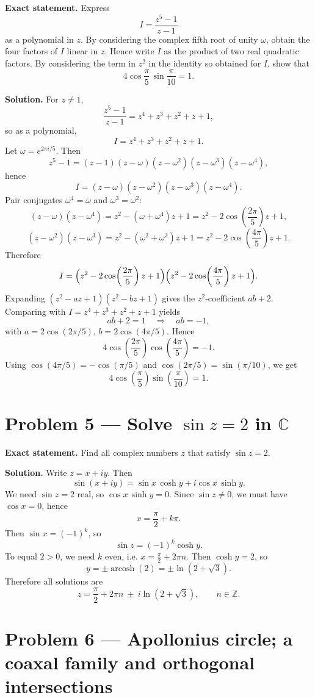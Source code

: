 \documentclass[12pt,a4paper]{article}
\theoremstyle{plain}
\theoremstyle{definition}      %
\begin{document}
\textbf{Exact statement.}
Express
\[
I=\frac{z^5-1}{z-1}
\]
as a polynomial in \(z\). By considering the complex fifth root of unity \(\omega\), obtain the four factors of \(I\) linear in \(z\).
Hence write \(I\) as the product of two real quadratic factors. By considering the term in \(z^2\) in the identity so obtained for \(I\),
show that
\[
4\cos\frac{\pi}{5}\,\sin\frac{\pi}{10}=1.
\]

\textbf{Solution.}
For \(z\neq1\),
\[
\frac{z^5-1}{z-1}=z^4+z^3+z^2+z+1,
\]
so as a polynomial,
\[
I=z^4+z^3+z^2+z+1.
\]
Let \(\omega=e^{2\pi i/5}\). Then
\[
z^5-1=(z-1)(z-\omega)(z-\omega^2)(z-\omega^3)(z-\omega^4),
\]
hence
\[
I=(z-\omega)(z-\omega^2)(z-\omega^3)(z-\omega^4).
\]
Pair conjugates \(\omega^4=\overline{\omega}\) and \(\omega^3=\overline{\omega^2}\):
\[
(z-\omega)(z-\omega^4)=z^2-(\omega+\omega^4)z+1
= z^2-2\cos\!\left(\frac{2\pi}{5}\right)z+1,
\]
\[
(z-\omega^2)(z-\omega^3)=z^2-(\omega^2+\omega^3)z+1
= z^2-2\cos\!\left(\frac{4\pi}{5}\right)z+1.
\]
Therefore
\[
I=\Bigl(z^2-2\cos\!\left(\frac{2\pi}{5}\right)z+1\Bigr)
\Bigl(z^2-2\cos\!\left(\frac{4\pi}{5}\right)z+1\Bigr).
\]
Expanding \((z^2-az+1)(z^2-bz+1)\) gives the \(z^2\)-coefficient \(ab+2\). Comparing with
\(I=z^4+z^3+z^2+z+1\) yields
\[
ab+2=1\quad\Longrightarrow\quad ab=-1,
\]
with \(a=2\cos(2\pi/5)\), \(b=2\cos(4\pi/5)\). Hence
\[
4\cos\!\left(\frac{2\pi}{5}\right)\cos\!\left(\frac{4\pi}{5}\right)=-1.
\]
Using \(\cos(4\pi/5)=-\cos(\pi/5)\) and \(\cos(2\pi/5)=\sin(\pi/10)\), we get
\[
4\cos\!\left(\frac{\pi}{5}\right)\sin\!\left(\frac{\pi}{10}\right)=1.
\]


\section*{Problem 5 — Solve \(\sin z=2\) in \(\mathbb{C}\)}

\textbf{Exact statement.}
Find all complex numbers \(z\) that satisfy \(\sin z=2\).

\textbf{Solution.}
Write \(z=x+iy\). Then
\[
\sin(x+iy)=\sin x\,\cosh y + i\cos x\,\sinh y.
\]
We need \(\sin z=2\) real, so \(\cos x\,\sinh y=0\). Since \(\sin z\neq 0\), we must have \(\cos x=0\), hence
\[
x=\frac{\pi}{2}+k\pi.
\]
Then \(\sin x = (-1)^k\), so
\[
\sin z = (-1)^k \cosh y.
\]
To equal \(2>0\), we need \(k\) even, i.e. \(x=\frac{\pi}{2}+2\pi n\). Then \(\cosh y=2\), so
\[
y=\pm \operatorname{arcosh}(2)=\pm \ln(2+\sqrt3).
\]
Therefore all solutions are
\[
z=\frac{\pi}{2}+2\pi n \ \pm\ i\ln(2+\sqrt3),\qquad n\in\mathbb{Z}.
\]
\section*{Problem 6 — Apollonius circle; a coaxal family and orthogonal intersections}
\end{document}
